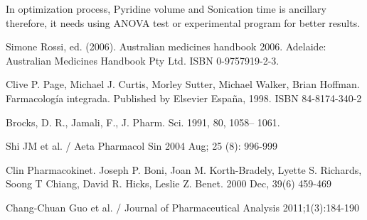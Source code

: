 \documentclass[12pt]{article} %
\begin{document}
  In optimization process, Pyridine volume and Sonication time is ancillary therefore, it needs using ANOVA test or experimental program for better results.


\newpage

\begin{thebibliography}{100}
	Simone Rossi, ed. (2006).  Australian medicines handbook 2006. Adelaide: Australian Medicines Handbook Pty Ltd. ISBN 0-9757919-2-3.

	Clive P. Page, Michael J. Curtis, Morley Sutter, Michael Walker, Brian Hoffman. Farmacología integrada. Published by Elsevier España, 1998. ISBN 84-8174-340-2

	Brocks, D. R., Jamali, F., J. Pharm. Sci. 1991, 80, 1058– 1061.


        Shi JM et al. / Aeta Pharmacol Sin 2004 Aug; 25 (8): 996-999

        Clin Pharmacokinet. Joseph P. Boni, Joan M. Korth-Bradely, Lyette S. Richards, Soong T Chiang, David R. Hicks, Leslie Z. Benet. 2000 Dec, 39(6) 459-469

	Chang-Chuan Guo et al. / Journal of Pharmaceutical Analysis  2011;1(3):184-190

\end{thebibliography}
\end{document}
